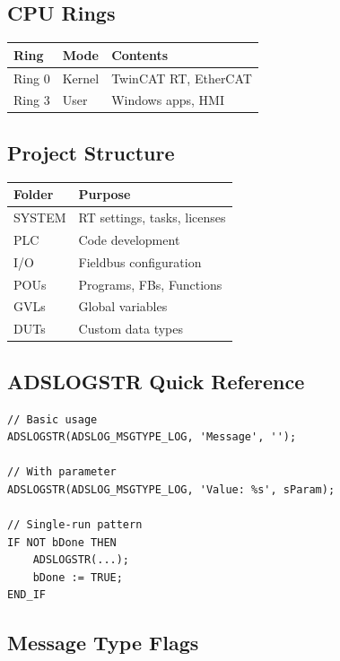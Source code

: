 \documentclass[11pt,a4paper]{article}
\begin{document}
\subsection*{CPU Rings}

\begin{table}[h]
\centering
\begin{tabular}{@{}lll@{}}
\toprule
\textbf{Ring} & \textbf{Mode} & \textbf{Contents} \\
\midrule
Ring 0 & Kernel & TwinCAT RT, EtherCAT \\
Ring 3 & User & Windows apps, HMI \\
\bottomrule
\end{tabular}
\end{table}

\subsection*{Project Structure}

\begin{table}[h]
\centering
\begin{tabular}{@{}ll@{}}
\toprule
\textbf{Folder} & \textbf{Purpose} \\
\midrule
SYSTEM & RT settings, tasks, licenses \\
PLC & Code development \\
I/O & Fieldbus configuration \\
POUs & Programs, FBs, Functions \\
GVLs & Global variables \\
DUTs & Custom data types \\
\bottomrule
\end{tabular}
\end{table}

\subsection*{ADSLOGSTR Quick Reference}

\begin{lstlisting}
// Basic usage
ADSLOGSTR(ADSLOG_MSGTYPE_LOG, 'Message', '');

// With parameter
ADSLOGSTR(ADSLOG_MSGTYPE_LOG, 'Value: %s', sParam);

// Single-run pattern
IF NOT bDone THEN
    ADSLOGSTR(...);
    bDone := TRUE;
END_IF
\end{lstlisting}

\subsection*{Message Type Flags}
\end{document}
